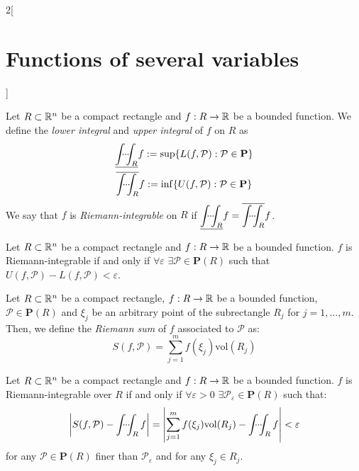 \documentclass[../../../main.tex]{subfiles}
\begin{document}
\begin{multicols}{2}[\section{Functions of several variables}]
  \begin{definition}
    Let $R\subset\mathbb{R}^n$ be a compact rectangle and $f:R\rightarrow\mathbb{R} $ be a bounded function. We define the \emph{lower integral} and \emph{upper integral} of $f$ on $R$ as
    \begin{gather*}
      \underline{\dotsint_{R}}f:=\sup\{L(f,\mathcal{P}):\mathcal{P}\in\textbf{P}\}\\
      \overline{\dotsint_{R}}f:=\inf\{U(f,\mathcal{P}):\mathcal{P}\in\textbf{P}\}
    \end{gather*} We say that $f$ is \emph{Riemann-integrable} on $R$ if $\displaystyle\underline{\dotsint_{R}}f=\overline{\dotsint_{R}}f$.
  \end{definition}
  \begin{proposition}
    Let $R\subset\mathbb{R}^n$ be a compact rectangle and $f:R\rightarrow\mathbb{R} $ be a bounded function. $f$ is Riemann-integrable if and only if $\forall\varepsilon$ $\exists\mathcal{P}\in\textbf{P}(R)$ such that $U(f,\mathcal{P})-L(f,\mathcal{P})<\varepsilon$.
  \end{proposition}
  \begin{definition}
    Let $R\subset\mathbb{R}^n$ be a compact rectangle, $f:R\rightarrow\mathbb{R} $ be a bounded function, $\mathcal{P}\in\textbf{P}(R)$ and $\xi_j$ be an arbitrary point of the subrectangle $R_j$ for $j=1,\ldots,m$. Then, we define the \emph{Riemann sum} of $f$ associated to $\mathcal{P}$ as: $$S(f,\mathcal{P})=\sum_{j=1}^mf(\xi_j)\text{vol}(R_j)$$
  \end{definition}
  \begin{theorem}
    Let $R\subset\mathbb{R}^n$ be a compact rectangle and $f:R\rightarrow\mathbb{R} $ be a bounded function. $f$ is Riemann-integrable over $R$ if and only if $\forall\varepsilon>0$ $\exists\mathcal{P}_\varepsilon\in\textbf{P}(R)$ such that: $$\left|S(f,\mathcal{P})-\dotsint_Rf\right|=\left|\sum_{j=1}^mf(\xi_j)\text{vol}(R_j)-\dotsint_Rf\right|<\varepsilon$$ for any $\mathcal{P}\in\textbf{P}(R)$ finer than $\mathcal{P}_\varepsilon$ and for any $\xi_j\in R_j$.
  \end{theorem}

\end{multicols}
\end{document}
